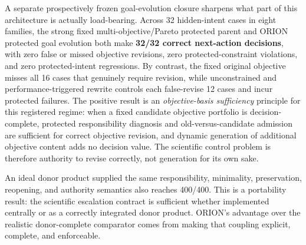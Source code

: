A separate prospectively frozen goal-evolution closure sharpens what part of this architecture is actually load-bearing. Across 32 hidden-intent cases in eight families, the strong fixed multi-objective/Pareto protected parent and ORION protected goal evolution both make \textbf{32/32 correct next-action decisions}, with zero false or missed objective revisions, zero protected-constraint violations, and zero protected-intent regressions. By contrast, the fixed original objective misses all 16 cases that genuinely require revision, while unconstrained and performance-triggered rewrite controls each false-revise 12 cases and incur protected failures. The positive result is an \emph{objective-basis sufficiency} principle for this registered regime: when a fixed candidate objective portfolio is decision-complete, protected responsibility diagnosis and old-versus-candidate admission are sufficient for correct objective revision, and dynamic generation of additional objective content adds no decision value. The scientific control problem is therefore authority to revise correctly, not generation for its own sake.

An ideal donor product supplied the same responsibility, minimality, preservation, reopening, and authority semantics also reaches 400/400. This is a portability result: the scientific escalation contract is sufficient whether implemented centrally or as a correctly integrated donor product. ORION's advantage over the realistic donor-complete comparator comes from making that coupling explicit, complete, and enforceable.


